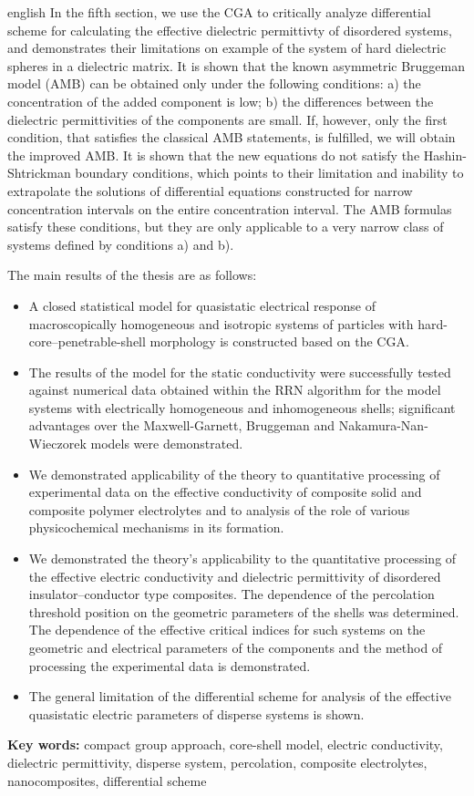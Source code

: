 \begin{otherlanguage*}{english}
In the fifth section, we use the CGA to critically analyze differential scheme for calculating the effective dielectric permittivty of disordered systems, and demonstrates their limitations on example of the system of hard dielectric spheres in a dielectric matrix. It is shown that the known asymmetric Bruggeman model (AMB) can be obtained only under the following conditions:
a) the concentration of the added component is low;
b) the differences between the dielectric permittivities of the components are small.
If, however, only the first condition, that satisfies the classical AMB statements, is fulfilled, we will obtain the improved AMB.
It is shown that the new equations do not satisfy the Hashin-Shtrickman boundary conditions, which points to their limitation and inability to extrapolate the solutions of differential equations constructed for narrow concentration intervals on the entire concentration interval. The AMB formulas satisfy these conditions, but they are only applicable to a very narrow class of systems defined by conditions a) and b).

The main results of the thesis are as follows:
\begin {itemize} [leftmargin = *]
\item
A closed statistical model for quasistatic electrical response of macroscopically homogeneous and isotropic systems of particles with hard-core--penetrable-shell morphology is constructed based on the CGA.
\item
The results of the model for the static conductivity were successfully tested against numerical data obtained within the RRN algorithm for the model systems with electrically homogeneous and inhomogeneous shells;  significant advantages over the Maxwell-Garnett, Bruggeman and Nakamura-Nan-Wieczorek models were demonstrated.
\item
We demonstrated applicability of the theory to quantitative processing of experimental data on the effective conductivity of composite solid and composite polymer electrolytes and to analysis of the role of various physicochemical mechanisms in its formation.
\item
We demonstrated the theory's applicability to the quantitative processing of the effective electric conductivity and dielectric permittivity of disordered insulator--conductor type composites. The dependence of the percolation threshold position on the geometric parameters of the shells was determined. The dependence of the effective critical indices for such systems on the geometric and electrical parameters of the components and the method of processing the experimental data is demonstrated.
\item
The general limitation of the differential scheme for analysis of the effective quasistatic electric parameters of disperse systems is shown.
\end {itemize}


\vskip 15pt
\textbf{Key words:} compact group approach, core-shell model, electric conductivity, dielectric permittivity, disperse system, percolation, composite electrolytes, nanocomposites, differential scheme

\end{otherlanguage*}